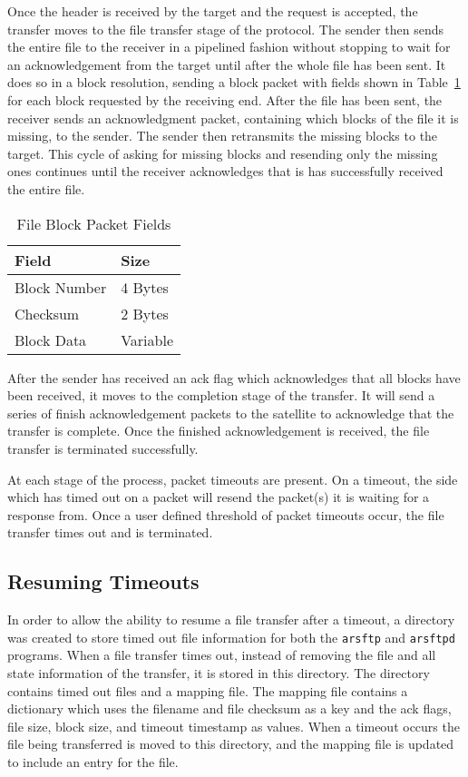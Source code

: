 \documentclass[journal]{./IEEEtran}
\begin{document}
Once the header is received by the target and the request is accepted, the transfer moves to the file transfer stage of the protocol.  The sender then sends the entire file to the receiver in a pipelined fashion without stopping to wait for an acknowledgement from the target until after the whole file has been sent. It does so in a block resolution, sending a block packet with fields shown in Table~\ref{table_block_packet} for each block requested by the receiving end.  After the file has been sent, the receiver sends an acknowledgment packet, containing which blocks of the file it is missing, to the sender. The sender then retransmits the missing blocks to the target. This cycle of asking for missing blocks and resending only the missing ones continues until the receiver acknowledges that is has successfully received the entire file.

\begin{table}[h!]
\caption{File Block Packet Fields}
\label{table_block_packet}
\begin{center}
\begin{tabular}{|l|l|} \hline
\textbf{Field} & \textbf{Size} \\ \hline
Block Number & 4 Bytes \\ \hline
Checksum & 2 Bytes \\ \hline
Block Data & Variable \\ \hline
\end{tabular}
\end{center}
\end{table}

After the sender has received an ack flag which acknowledges that all blocks have been received, it moves to the completion stage of the transfer.  It will send a series of finish acknowledgement packets to the satellite to acknowledge that the transfer is complete.  Once the finished acknowledgement is received, the file transfer is terminated successfully.

At each stage of the process, packet timeouts are present.  On a timeout, the side which has timed out on a packet will resend the packet(s) it is waiting for a response from.  Once a user defined threshold of packet timeouts occur, the file transfer times out and is terminated.

\subsection{Resuming Timeouts}
In order to allow the ability to resume a file transfer after a timeout, a directory was created to store timed out file information for both the {\tt arsftp} and {\tt arsftpd} programs.  When a file transfer times out, instead of removing the file and all state information of the transfer, it is stored in this directory.  The directory contains timed out files and a mapping file.  The mapping file contains a dictionary which uses the filename and file checksum as a key and the ack flags, file size, block size, and timeout timestamp as values.  When a timeout occurs the file being transferred is moved to this directory, and the mapping file is updated to include an entry for the file.
\end{document}
